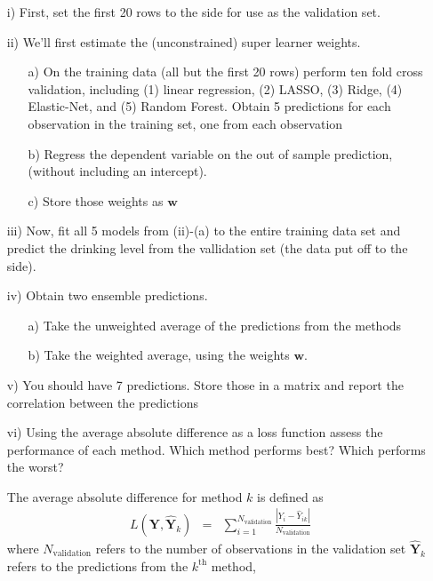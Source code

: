 \documentclass[letterpaper,12pt]{article}
\numberwithin{equation}{section}
\numberwithin{equation}{section}
\begin{document}
\begin{itemize}
\item[i)] First, set the first 20 rows to the side for use as the validation set.
\item[ii)] We'll first estimate the (unconstrained) super learner weights.  
\begin{itemize}
\item[a)] On the training data (all but the first 20 rows) perform ten fold cross validation, including (1) linear regression, (2) LASSO, (3) Ridge, (4) Elastic-Net, and (5) Random Forest.  Obtain 5 predictions for each observation in the training set, one from each observation
\item[b)] Regress the dependent variable on the out of sample prediction, (without including an intercept).
\item[c)] Store those weights as $\boldsymbol{w}$
\end{itemize}
\item[iii)] Now, fit all 5 models from (ii)-(a) to the entire training data set and predict the drinking level from the vallidation set (the data put off to the side).
\item[iv)]   Obtain two ensemble predictions.  
\begin{itemize}
\item[a)] Take the unweighted average of the predictions from the methods
\item[b)] Take the weighted average, using the weights $\boldsymbol{w}$.
\end{itemize}
\item[v)] You should have 7 predictions. Store those in a matrix and report the correlation between the predictions
\item[vi)] Using the average absolute difference as a loss function assess the performance of each method.  Which method performs best?  Which performs the worst? 

\noindent The average absolute difference for method $k$ is defined as 
\begin{eqnarray}
L(\boldsymbol{Y}, \widehat{\boldsymbol{Y}}_{k}) & = & \sum_{i=1}^{N_{\text{validation}}} \frac{|Y_{i} - \widehat{Y}_{ik}| }{ N_{\text{validation}} }\nonumber 
\end{eqnarray}
where $N_{\text{validation}}$ refers to the number of observations in the validation set $\widehat{\boldsymbol{Y}}_{k}$ refers to the predictions from the $k^{\text{th}}$ method, 


\end{itemize}
\end{document}
